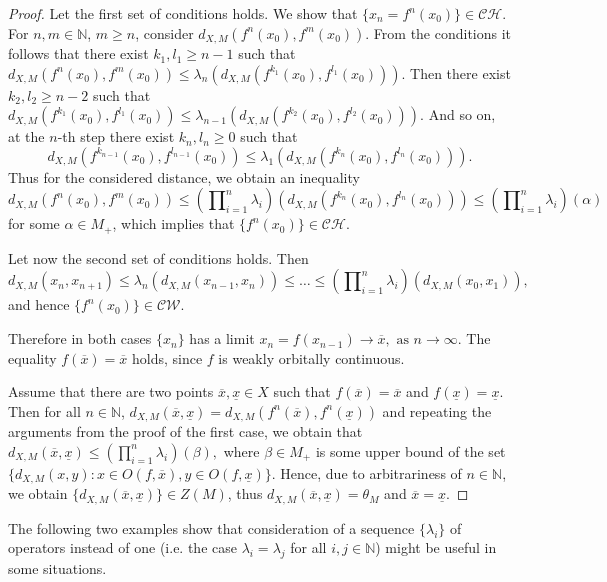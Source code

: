 \documentclass[12pt]{amsart}          %
\newcommand{\NN}{\mathbb N}
\begin{document}
\begin{proof}
Let the first set of conditions holds. We show that $\{x_n = f^n(x_0)\}\in \mathcal{CH}$.
 For  $n,m\in\NN$, $m\ge n$, consider  $d_{X,M}(f^n(x_0),f^m(x_0))$. From the conditions it follows that there exist $k_1,l_1\ge n-1$ such that
$
d_{X,M}(f^n(x_0),f^m(x_0))\le \lambda_n (d_{X,M}(f^{k_1}(x_0),f^{l_1}(x_0))).
$
Then there exist  $k_2,l_2\ge n-2$ such that 
$
d_{X,M}(f^{k_1}(x_0),f^{l_1}(x_0))\le \lambda_{n-1} (d_{X,M}(f^{k_2}(x_0),f^{l_2}(x_0))).
$
And so on, at the $n$-th step there exist  $k_n,l_n\ge 0$ such that 
$$
d_{X,M}(f^{k_{n-1}}(x_0),f^{l_{n-1}}(x_0))\le \lambda_1 (d_{X,M}(f^{k_n}(x_0),f^{l_n}(x_0))).
$$
Thus for the considered distance, we obtain an inequality
$$
d_{X,M}(f^n(x_0),f^m(x_0))\le \left(\prod\nolimits_{i=1}^n\lambda_i\right) (d_{X,M}(f^{k_n}(x_0),f^{l_n}(x_0)))\le \left(\prod\nolimits_{i=1}^n\lambda_i\right)(\alpha)
$$
for some $\alpha\in M_+$, which implies that $\{f^n(x_0)\}\in \mathcal{CH}$.


Let now the second set of conditions holds. Then
$$
d_{X,M}(x_n,x_{n+1})
\leq 
\lambda_n(d_{X,M}(x_{n-1},x_{n}))
 \leq \ldots\leq
\left(\prod\nolimits_{i=1}^n\lambda_i\right)(d_{X,M}(x_{0},x_{1})),
$$
and hence $\{f^n(x_0)\}\in \mathcal{CW}$. 

Therefore in both cases $\{ x_n\}$ has a limit
$
x_n=f(x_{n-1})\to \overline{x},\text{ as } n\to \infty.    
$
The equality $f(\overline{x})=\overline{x}$ holds, since $f$ is weakly orbitally continuous. 

Assume that there are two points $\overline{x},\underline{x}\in X$  such that $f(\overline{x}) =\overline{x}$ and $f(\underline{x}) = \underline{x}$.
 Then for all $n\in \NN$,
$
d_{X,M}(\overline{x},\underline{x})
=
d_{X,M}(f^n(\overline{x}),f^n(\underline{x}))$ and repeating the arguments from the proof of the first case, we obtain that $d_{X,M}(\overline{x},\underline{x})\leq \left(\prod\nolimits_{i=1}^n\lambda_i\right)(\beta),$
where $\beta\in M_+$ is some upper bound of the set $\{d_{X,M}(x,y)\colon x\in  O(f, \overline{x}),y\in  O(f, \underline{x})\}$.
Hence, due to arbitrariness of $n\in\NN$, 
 we obtain $\{d_{X,M}(\overline{x},\underline{x})\}\in Z(M)$, thus $d_{X,M}(\overline{x},\underline{x}) = \theta_M$ and $\overline{x}=\underline{x}$.
\end{proof}
The following two examples show that consideration of a sequence $\{\lambda_i\}$ of operators instead of one (i.e. the case $\lambda_i = \lambda_j$ for all $i,j\in \NN$) might be useful in some situations.
\end{document}

